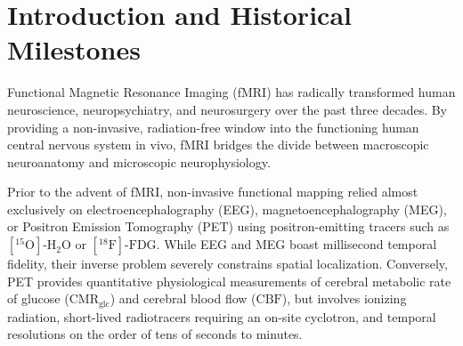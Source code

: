 \documentclass[11pt,a4paper]{article}
\begin{document}
\begin{abstract}
The mathematical formulation of the mass-univariate General Linear Model (GLM) is presented in full matrix notation, incorporating prewhitened noise covariance architectures, convolution operators, and Random Field Theory (RFT) for rigorous Family-Wise Error (FWE) multiple comparison control. Furthermore, we provide a deep analysis of resting-state fMRI (rs-fMRI), spontaneous low-frequency fluctuations ($0.01\text{--}0.1\text{ Hz}$), seed-based correlation, spatial Independent Component Analysis (ICA), graph theoretical topology, and canonical resting-state networks (Default Mode, Salience, and Central Executive networks). Finally, we elucidate high-stakes clinical translation—most notably presurgical functional localization of motor and eloquent language cortices, neurovascular uncoupling pitfalls in high-grade gliomas, ultra-high field (7T/11.7T) submillimeter laminar fMRI, and multi-modal integration with EEG, MEG, and PET.
\end{abstract}

\tableofcontents
\newpage

\section{Introduction and Historical Milestones}
Functional Magnetic Resonance Imaging (fMRI) has radically transformed human neuroscience, neuropsychiatry, and neurosurgery over the past three decades. By providing a non-invasive, radiation-free window into the functioning human central nervous system in vivo, fMRI bridges the divide between macroscopic neuroanatomy and microscopic neurophysiology. 

Prior to the advent of fMRI, non-invasive functional mapping relied almost exclusively on electroencephalography (EEG), magnetoencephalography (MEG), or Positron Emission Tomography (PET) using positron-emitting tracers such as $[^{15}\text{O}]\text{-H}_2\text{O}$ or $[^{18}\text{F}]\text{-FDG}$. While EEG and MEG boast millisecond temporal fidelity, their inverse problem severely constrains spatial localization. Conversely, PET provides quantitative physiological measurements of cerebral metabolic rate of glucose ($\text{CMR}_{\text{glc}}$) and cerebral blood flow ($\text{CBF}$), but involves ionizing radiation, short-lived radiotracers requiring an on-site cyclotron, and temporal resolutions on the order of tens of seconds to minutes.
\end{document}
